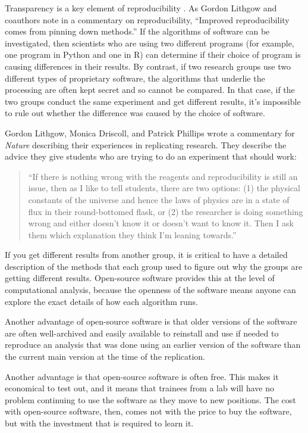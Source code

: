 \documentclass[]{tufte-book}
\begin{document}
Transparency is a key element of reproducibility \citep{neff2021past}. As Gordon
Lithgow and coauthors note in a commentary on reproducibility, ``Improved
reproducibility comes from pinning down methods.'' \citep{lithgow2017long} If the
algorithms of software can be investigated, then scientists who are using two
different programs (for example, one program in Python and one in R) can
determine if their choice of program is causing differences in their results. By
contrast, if two research groups use two different types of proprietary
software, the algorithms that underlie the processing are often kept secret and
so cannot be compared. In that case, if the two groups conduct the same
experiment and get different results, it's impossible to rule out whether the
difference was caused by the choice of software.

Gordon Lithgow, Monica Driscoll, and Patrick Phillips wrote a commentary for
\emph{Nature} describing their experiences in replicating research. They
describe the advice they give students who are trying to do an
experiment that should work:

\begin{quote}
``If there is nothing wrong with the reagents and reproducibility is still an
issue, then as I like to tell students, there are two options: (1) the physical
constants of the universe and hence the laws of physics are in a state of flux
in their round-bottomed flask, or (2) the researcher is doing something wrong
and either doesn't know it or doesn't want to know it. Then I ask them which
explanation they think I'm leaning towards.'' \citep{gibb2014reproducibility}
\end{quote}

If you get different results from another group, it is critical to have a
detailed description of the methods that each group used to figure out why
the groups are getting different results. Open-source software provides this
at the level of computational analysis, because the openness of the software
means anyone can explore the exact details of how each algorithm runs.

Another advantage of open-source software is that older versions of the software
are often well-archived and easily available to reinstall and use if needed to
reproduce an analysis that was done using an earlier version of the software
than the current main version at the time of the replication.

Another advantage is that open-source software is often free. This makes it
economical to test out, and it means that trainees from a lab will have no
problem continuing to use the software as they move to new positions.
The cost with open-source software, then, comes not with the price to buy
the software, but with the investment that is required to learn it.
\end{document}
